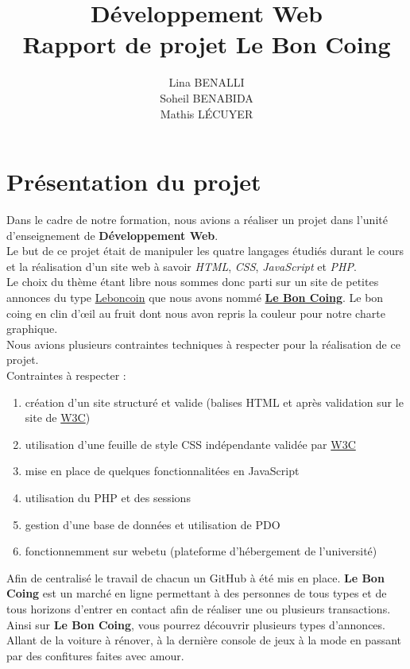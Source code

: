\documentclass[11pt,a4paper]{article}
\title{Développement Web\\Rapport de projet \textbf{Le Bon Coing}}
\author{Lina BENALLI\\Soheil BENABIDA\\Mathis LÉCUYER}
\date{}
\begin{document}
\maketitle

\newpage

\tableofcontents

\newpage

\section{Présentation du projet}
Dans le cadre de notre formation, nous avions a réaliser un projet dans l'unité d'enseignement de \textbf{Développement Web}.\\
Le but de ce projet était de manipuler les quatre langages étudiés durant le cours et la réalisation d'un site web à savoir \emph{HTML}, \emph{CSS}, \emph{JavaScript} et \emph{PHP}.\\
Le choix du thème étant libre nous sommes donc parti sur un site de petites annonces du type \underline{Leboncoin} que nous avons nommé \underline{\textbf{Le Bon Coing}}. Le bon coing en clin d'\oe{}il au fruit dont nous avon repris la couleur pour notre charte graphique.\\
Nous avions plusieurs contraintes techniques à respecter pour la réalisation de ce projet.\\
Contraintes à respecter :~
\begin{enumerate}
    \item création d'un site structuré et valide (balises HTML et après validation sur le site de \href{https://validator.w3.org}{W3C})
    \item utilisation d'une feuille de style CSS indépendante validée par \href{https://jigsaw.w3.org/css-validator/}{W3C}
    \item mise en place de quelques fonctionnalitées en JavaScript
    \item utilisation du PHP et des sessions
    \item gestion d'une base de données et utilisation de PDO
    \item fonctionnemment sur webetu (plateforme d'hébergement de l'université)
\end{enumerate}
Afin de centralisé le travail de chacun un GitHub à été mis en place.
\textbf{Le Bon Coing} est un marché en ligne permettant à des personnes de tous types et de tous horizons d'entrer en contact afin de réaliser une ou plusieurs transactions.\\
Ainsi sur \textbf{Le Bon Coing}, vous pourrez découvrir plusieurs types d'annonces. Allant de la voiture à rénover, à la dernière console de jeux à la mode en passant par des confitures faites avec amour.
\end{document}
